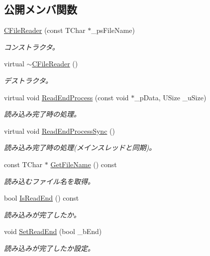 \subsection*{公開メンバ関数}
\begin{DoxyCompactItemize}
\item 
\hyperlink{class_c_file_reader_ac1c1601d5d3fea0418cc561a979fa5b4}{C\+File\+Reader} (const T\+Char $\ast$\+\_\+ps\+File\+Name)
\begin{DoxyCompactList}\small\item\em コンストラクタ。 \end{DoxyCompactList}\item 
virtual \hyperlink{class_c_file_reader_a4d1f50d0e41e3de38890100df04325b2}{$\sim$\+C\+File\+Reader} ()
\begin{DoxyCompactList}\small\item\em デストラクタ。 \end{DoxyCompactList}\item 
virtual void \hyperlink{class_c_file_reader_a5a18550133826ac43096629f6eaa8c42}{Read\+End\+Process} (const void $\ast$\+\_\+p\+Data, U\+Size \+\_\+u\+Size)
\begin{DoxyCompactList}\small\item\em 読み込み完了時の処理。 \end{DoxyCompactList}\item 
virtual void \hyperlink{class_c_file_reader_ad95360f0d328f570fbc5faf3739732e1}{Read\+End\+Process\+Sync} ()
\begin{DoxyCompactList}\small\item\em 読み込み完了時の処理(メインスレッドと同期)。 \end{DoxyCompactList}\item 
const T\+Char $\ast$ \hyperlink{class_c_file_reader_ae59f3337c42c1ca9e26a46336f52bd96}{Get\+File\+Name} () const 
\begin{DoxyCompactList}\small\item\em 読み込むファイル名を取得。 \end{DoxyCompactList}\item 
bool \hyperlink{class_c_file_reader_ae354b54f0ebdbbf5bf59c773004cef6b}{Is\+Read\+End} () const 
\begin{DoxyCompactList}\small\item\em 読み込みが完了したか。 \end{DoxyCompactList}\item 
void \hyperlink{class_c_file_reader_a0f04fd0be744cccb3a057e6cfd2cecd1}{Set\+Read\+End} (bool \+\_\+b\+End)
\begin{DoxyCompactList}\small\item\em 読み込みが完了したか設定。 \end{DoxyCompactList}\end{DoxyCompactItemize}
